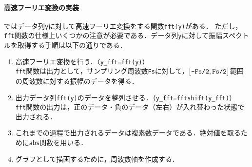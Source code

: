 \paragraph{高速フーリエ変換の実装}
\matlab ではデータ列\texttt{y}に対して高速フーリエ変換をする関数\texttt{fft(y)}がある．
ただし，\texttt{fft}関数の仕様上いくつかの注意が必要である．データ列\texttt{y}に対して振幅スペクトルを取得する手順は以下の通りである．
\begin{enumerate}
    \item 高速フーリエ変換を行う．（\texttt{y\_fft=fft(y)}）\\
          \texttt{fft}関数は出力として，サンプリング周波数\texttt{Fs}に対して，\(\big[\textrm{\texttt{-Fs/2}},\textrm{\texttt{Fs/2}}\big]\)範囲の周波数に対する振幅のデータを得る．
    \item 出力データ列\texttt{fft(y)}のデータを整列させる．（\texttt{y\_fft=fftshift(y\_fft)}）\\
          \texttt{fft}関数の出力は，正のデータ・負のデータ（左右）が入れ替わった状態で出力される．
    \item これまでの過程で出力されるデータは複素数データである．絶対値を取るために\texttt{abs}関数を用いる．
    \item グラフとして描画するために，周波数軸を作成する．
\end{enumerate}
